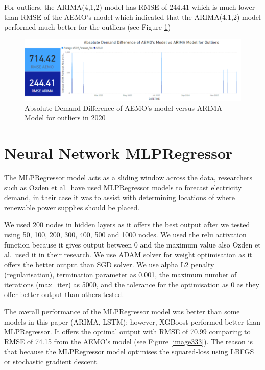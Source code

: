 \documentclass[mstat,12pt]{unswthesis}
\begin{document}
For outliers, the ARIMA(4,1,2) model has RMSE of 244.41 which is much
lower than RMSE of the AEMO's model which indicated that the
ARIMA(4,1,2) model performed much better for the outliers (see Figure
\ref{image7})

\begin{figure}[H]
\includegraphics[width=140mm]{image7.png}
\caption{Absolute Demand Difference of AEMO's model versus ARIMA Model for outliers in 2020}
\label{image7}
\end{figure}

\hypertarget{neural-network-mlpregressor}{%
\section{Neural Network
MLPRegressor}\label{neural-network-mlpregressor}}

The MLPRegressor model acts as a sliding window across the data,
researchers such as Ozden et al.~have used MLPRegressor models to
forecast electricity demand, in their case it was to assist with
determining locations of where renewable power supplies should be
placed\cite{ozden_2018_prediction}.

We used 200 nodes in hidden layers as it offers the best output after we
tested using 50, 100, 200, 300, 400, 500 and 1000 nodes. We used the
relu activation function because it gives output between 0 and the
maximum value also Ozden et al.~used it in their research. We use ADAM
solver for weight optimisation as it offers the better output than SGD
solver. We use alpha L2 penalty (regularisation), termination parameter
as 0.001, the maximum number of iterations (max\_iter) as 5000, and the
tolerance for the optimisation as 0 as they offer better output than
others tested.

The overall performance of the MLPRegressor model was better than some
models in this paper (ARIMA, LSTM); however, XGBoost performed better
than MLPRegressor. It offers the optimal output with RMSE of 70.99
comparing to RMSE of 74.15 from the AEMO's model (see Figure
\ref{image333}). The reason is that because the MLPRegressor model
optimises the squared-loss using LBFGS or stochastic gradient descent.
\end{document}
